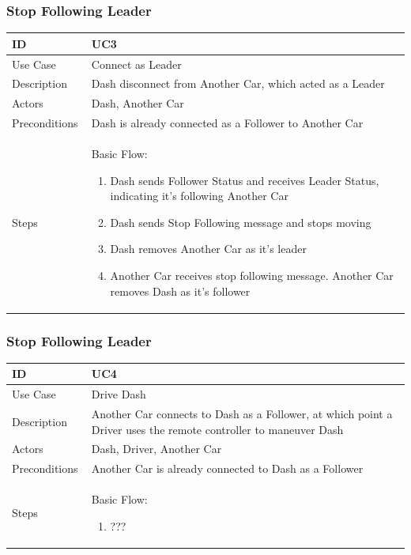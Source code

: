 \documentclass[12pt]{article}
\begin{document}
\subsubsection{Stop Following Leader}
\begin{longtable}{| p{0.2\linewidth} | p{0.8\linewidth} |}\hline 
    ID & UC3\\ \hline
    Use Case & Connect as Leader\\ \hline
    Description & Dash disconnect from Another Car, which acted as a Leader\\ \hline
    Actors & Dash, Another Car\\ \hline
    Preconditions & Dash is already connected as a Follower to Another Car\\ \hline
    Steps & Basic Flow: \begin{enumerate} %
        \itemsep 0em %
      \item Dash sends Follower Status and receives Leader Status, indicating it’s following Another Car
    \item Dash sends Stop Following message and stops moving
        \item Dash removes Another Car as it’s leader
        \item Another Car receives stop following message. Another Car removes Dash as it’s follower
  \end{enumerate}\\ \hline
\end{longtable}

\subsubsection{Stop Following Leader}
\begin{longtable}{| p{0.2\linewidth} | p{0.8\linewidth} |}\hline 
    ID & UC4\\ \hline
    Use Case & Drive Dash\\ \hline
    Description & Another Car connects to Dash as a Follower, at which point a Driver uses the remote controller to maneuver Dash\\ \hline
    Actors & Dash, Driver, Another Car\\ \hline
    Preconditions & Another Car is already connected to Dash as a Follower\\ \hline
    Steps & Basic Flow: \begin{enumerate} %
        \itemsep 0em %
      \item ???
  \end{enumerate}\\ \hline
\end{longtable}
\end{document}
